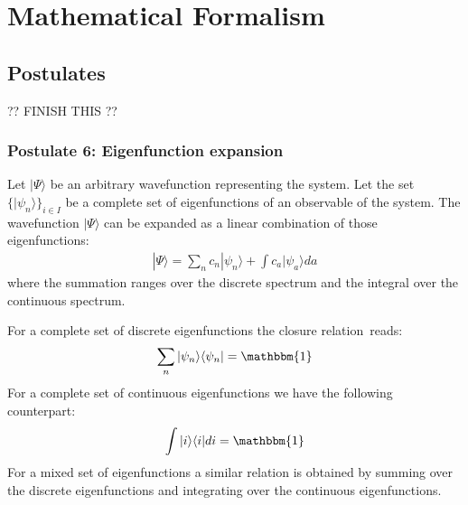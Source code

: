 \chapter{Mathematical Formalism}

\section{Postulates}

?? FINISH THIS ??

\subsection{Postulate 6: Eigenfunction expansion}

    
	\begin{formula}
    		Let $|\Psi\rangle$ be an arbitrary wavefunction representing the system. Let the set $\{|\psi_n\rangle\}_{i\in I}$ be a complete set of eigenfunctions of an observable of the system. The wavefunction $|\Psi\rangle$ can be expanded as a linear combination of those eigenfunctions:
		\begin{gather}
	        	\label{qm_formalism:eigenfunction_expansion}
			|\Psi\rangle = \sum_nc_n|\psi_n\rangle + \int c_a|\psi_a\rangle da
		\end{gather}
	        where the summation ranges over the discrete spectrum and the integral over the continuous spectrum.
	\end{formula}
   
	\begin{formula}
	    	For a complete set of discrete eigenfunctions the closure relation\footnotemark\ reads:
		\begin{gather}
		        \label{qm_formalism:closure}
			\sum_n|\psi_n\rangle\langle\psi_n| = \mathbbm{1}
		\end{gather}
	        For a complete set of continuous eigenfunctions we have the following counterpart:
	        \begin{gather}
		        \label{qm_formalism:closure_continuouos}
			\int|i\rangle\langle i|di = \mathbbm{1}
		\end{gather}
	        For a mixed set of eigenfunctions a similar relation is obtained by summing over the discrete eigenfunctions and integrating over the continuous eigenfunctions.
	\end{formula}

